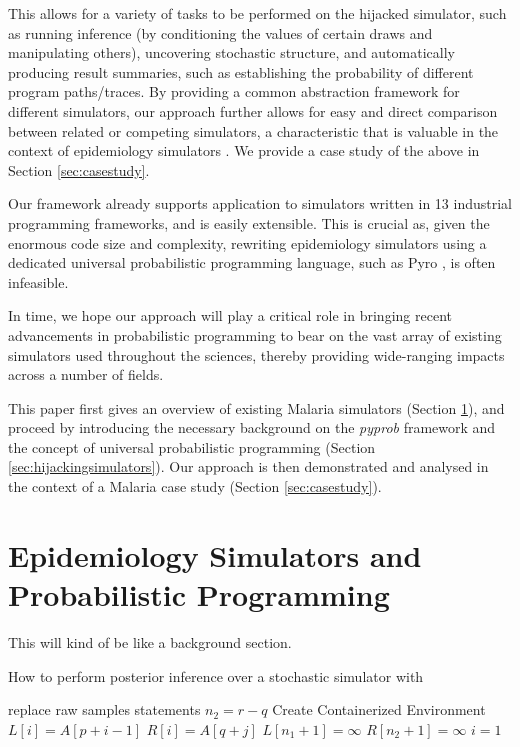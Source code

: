 \documentclass{article}
\begin{document}
This allows for a variety of tasks to be performed on
the hijacked simulator, such as running inference (by conditioning
the values of certain draws and manipulating others),
uncovering stochastic structure, and automatically
producing result summaries, such as establishing the probability
of different program paths/traces.  By providing a common abstraction 
framework for different simulators, our approach further allows for
easy and direct comparison between related or competing
simulators, a characteristic that is valuable in the context of
epidemiology simulators \cite{ferris_openmalaria_2015}. We provide a case study of the above in Section \ref{sec:casestudy}.

Our framework already supports application to simulators written in 13 industrial programming frameworks, and is easily extensible. This is crucial as, given the enormous code size and complexity, rewriting epidemiology simulators using a dedicated universal probabilistic programming language, such as Pyro \cite{bingham2019pyro}, is often infeasible.

In time, we hope our approach will play a critical role in
bringing recent advancements in probabilistic programming to bear on
the vast array of existing simulators used throughout the sciences,
thereby providing wide-ranging impacts across a number of fields.

This paper first gives an overview of existing Malaria simulators (Section \ref{sec:background}), and proceed by introducing the necessary background on the \textit{pyprob} framework and the concept of universal probabilistic programming (Section \ref{sec:hijackingsimulators}). Our approach is then demonstrated and analysed in the context of a Malaria case study (Section \ref{sec:casestudy}). 
\label{sec:related}


\section{Epidemiology Simulators and Probabilistic Programming}
\label{sec:background}
This will kind of be like a background section. 


  \begin{algorithm}
   \caption{How to perform posterior inference over a stochastic simulator with 
   }
    \begin{algorithmic}[1]

        \State replace raw samples statements 
        \State ${n_2} = r - q$
        \State Create Containerized Environment
            \State $L[i] = A[p + i - 1]$
        \EndFor
            \State $R[i] = A[q + j]$
        \EndFor
        \State $L[{n_1} + 1] =  \infty $
        \State $R[{n_2} + 1] =  \infty $
        \State $i = 1$
       \EndFunction

\end{algorithmic}
\end{algorithm}
\end{document}
